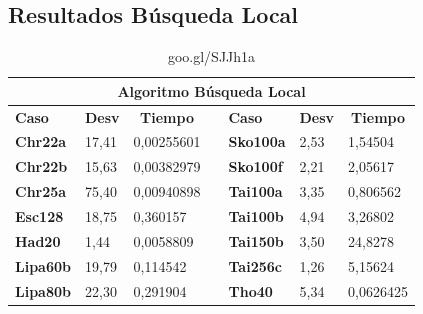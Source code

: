 \documentclass[a4paper, 12pt]{article}
\begin{document}
      \subsection*{Resultados Búsqueda Local}
\begin{table}[H]
\centering
\caption{goo.gl/SJJh1a}
\label{my-label}
\begin{tabular}{|l|l|l|l|l|l|l|}
\hline
\multicolumn{7}{|c|}{\textbf{Algoritmo Búsqueda Local}}                                                                                                                                    \\ \hline
\textbf{Caso}    & \multicolumn{1}{c|}{\textbf{Desv}} & \multicolumn{1}{c|}{\textbf{Tiempo}} &  & \textbf{Caso}    & \multicolumn{1}{c|}{\textbf{Desv}} & \multicolumn{1}{c|}{\textbf{Tiempo}} \\ \cline{1-3} \cline{5-7} 
\textbf{Chr22a}  & 17,41                              & 0,00255601                           &  & \textbf{Sko100a} & 2,53                               & 1,54504                              \\ \cline{1-3} \cline{5-7} 
\textbf{Chr22b}  & 15,63                              & 0,00382979                           &  & \textbf{Sko100f} & 2,21                               & 2,05617                              \\ \cline{1-3} \cline{5-7} 
\textbf{Chr25a}  & 75,40                              & 0,00940898                           &  & \textbf{Tai100a} & 3,35                               & 0,806562                             \\ \cline{1-3} \cline{5-7} 
\textbf{Esc128}  & 18,75                              & 0,360157                             &  & \textbf{Tai100b} & 4,94                               & 3,26802                              \\ \cline{1-3} \cline{5-7} 
\textbf{Had20}   & 1,44                               & 0,0058809                            &  & \textbf{Tai150b} & 3,50                               & 24,8278                              \\ \cline{1-3} \cline{5-7} 
\textbf{Lipa60b} & 19,79                              & 0,114542                             &  & \textbf{Tai256c} & 1,26                               & 5,15624                              \\ \cline{1-3} \cline{5-7} 
\textbf{Lipa80b} & 22,30                              & 0,291904                             &  & \textbf{Tho40}   & 5,34                               & 0,0626425                            \\ \cline{1-3} \cline{5-7} 

\end{tabular}
\end{table}
\end{document}
